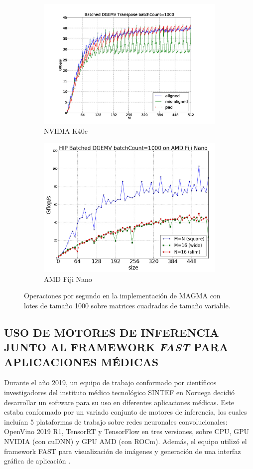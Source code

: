 \begin{figure}[h]
\centering
\begin{subfigure}{.5\textwidth}
  \centering
  \includegraphics[width=.8\linewidth]{Figures/grap11.png}
  \caption{NVIDIA K40c}
\end{subfigure}%
\begin{subfigure}{.5\textwidth}
  \centering
  \includegraphics[width=.8\linewidth]{Figures/grap12.png}
  \caption{AMD Fiji Nano}
\end{subfigure}
\caption{Operaciones por segundo en la implementación de MAGMA con lotes de tamaño 1000 sobre matrices cuadradas de tamaño variable.}
\label{fig:4}
\end{figure}

\subsection{USO DE MOTORES DE INFERENCIA JUNTO AL FRAMEWORK \textit{FAST} PARA APLICACIONES MÉDICAS}

Durante el año 2019, un equipo de trabajo conformado por científicos investigadores del instituto médico tecnológico SINTEF en Noruega decidió desarrollar un software para su uso en diferentes aplicaciones médicas. 
Este estaba conformado por un variado conjunto de motores de inferencia, los cuales incluían 5 plataformas de trabajo sobre redes neuronales convolucionales: OpenVino 2019 R1, TensorRT y TensorFlow en tres versiones, sobre CPU, GPU NVIDIA (con cuDNN) y GPU AMD (con ROCm). Además, el equipo utilizó el framework FAST para visualización de imágenes y generación de una interfaz gráfica de aplicación \cite{fast}.

